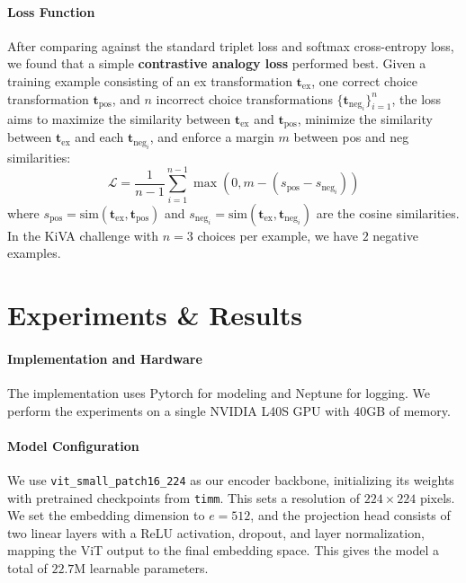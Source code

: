 \documentclass[twocolumn]{article} %
\begin{document}
\paragraph{Loss Function}
After comparing against the standard triplet loss and softmax cross-entropy loss, we found that a simple \textbf{contrastive analogy loss} \cite{chopra2005learning} performed best. Given a training example consisting of an ex transformation $\mathbf{t}_{\text{ex}}$, one correct choice transformation $\mathbf{t}_{\text{pos}}$, and $n$ incorrect choice transformations $\{\mathbf{t}_{\text{neg}_i}\}_{i=1}^{n}$, the loss aims to maximize the similarity between $\mathbf{t}_{\text{ex}}$ and $\mathbf{t}_{\text{pos}}$, minimize the similarity between $\mathbf{t}_{\text{ex}}$ and each $\mathbf{t}_{\text{neg}_i}$, and enforce a margin $m$ between pos and neg similarities:
\begin{equation}
\mathcal{L} = \frac{1}{n-1}\sum_{i=1}^{n-1} \max\left(0, m - \left(s_{\text{pos}} - s_{\text{neg}_i}\right)\right)
\end{equation}
where $s_{\text{pos}} = \text{sim}(\mathbf{t}_{\text{ex}}, \mathbf{t}_{\text{pos}})$ and $s_{\text{neg}_i} = \text{sim}(\mathbf{t}_{\text{ex}}, \mathbf{t}_{\text{neg}_i})$ are the cosine similarities. In the KiVA challenge with $n=3$ choices per example, we have $2$ negative examples.


\section{Experiments \& Results}

\paragraph{Implementation and Hardware} The implementation uses Pytorch for modeling and Neptune for logging. We perform the experiments on a single NVIDIA L40S GPU with $40$GB of memory.


\paragraph{Model Configuration}
We use \texttt{vit\_small\_patch16\_224} as our encoder backbone, initializing its weights with pretrained checkpoints from \texttt{timm}. This sets a resolution of $224 \times 224$ pixels. We set the embedding dimension to $e=512$, and the projection head consists of two linear layers with a ReLU activation, dropout, and layer normalization, mapping the ViT output to the final embedding space. This gives the model a total of $22.7$M learnable parameters.
\end{document}
